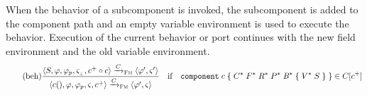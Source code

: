 \documentclass[a4paper,10pt,english]{article}
\begin{document}
When the behavior of a subcomponent is invoked, the subcomponent is added to the component path and an empty variable environment
is used to execute the behavior. Execution of the current behavior or port continues with the new field environment and the old
variable environment.
\begin{equation*}
	\tag{beh}
	\dfrac
	{
		\langle S, \varphi, \varphi_p, \varsigma_{{}_\bot}, c^+
		\circ c \rangle
			\xrightarrow{C}_\textsc{Fm}
		\langle \varphi', \varsigma' \rangle
	}
	{
		\langle c (), \varphi, \varphi_p, \varsigma, c^+ \rangle
			\xrightarrow{C}_\textsc{Fm}
		\langle \varphi', \varsigma \rangle
	}
	\quad \text{if} \quad
	\texttt{component} \; c \; \mathtt{\{} \; C^* \; F^* \; R^* \; P^* \; \mathit{B}^* \; \mathtt{\{} \; V^* \; S \; \mathtt{\}} \; \mathtt{\}}
	\in C[c^+]
\end{equation*}

% 
% 
\end{document}
